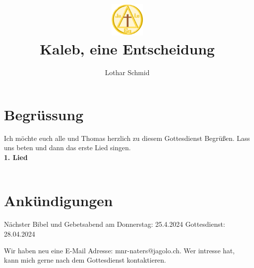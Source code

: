 \documentclass[12pt,a4paper]{scrarticle}
\title{\includegraphics[height=48pt]{assets/images/logo.png}\\Kaleb, eine Entscheidung}
\author{Lothar Schmid}
\begin{document}
\maketitle
\section{Begrüssung}
Ich möchte euch alle und Thomas herzlich zu diesem Gottesdienst Begrüßen. Lass uns beten und dann das erste Lied singen.
\\
\textbf{1. Lied}
\\ 
\\
\section{Ankündigungen}
Nächster Bibel und Gebetsabend am Donnerstag: 25.4.2024
Gottesdienst: 28.04.2024

Wir haben neu eine E-Mail Adresse: mnr-naters@jagolo.ch. Wer intresse hat, kann mich gerne nach dem Gottesdienst kontaktieren.
\end{document}
